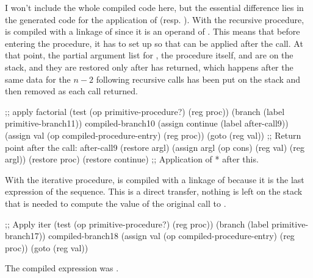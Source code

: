 \begin{exe}[5.34]
    I won’t include the whole compiled code here, but the essential difference 
    lies in the generated code for the application of  (resp. 
    ). With the recursive procedure,  is 
    compiled with a linkage of  since it is an operand of \vscm{*}. 
    This means that before entering the procedure, it has to set up 
     so that \vscm{*} can be applied after the call. At that 
    point, the partial argument list for \vscm{*}, the procedure \vscm{*} 
    itself, and  are on the stack, and they are restored only 
    after  has returned, which happens after the same 
    data for the $n - 2$ following recursive calls has been put on the stack and 
    then removed as each call returned.
    \begin{cscm}
	;; apply factorial
	  (test (op primitive-procedure?) (reg proc))
	  (branch (label primitive-branch11))
	compiled-branch10
	  (assign continue (label after-call9))
	  (assign val (op compiled-procedure-entry) (reg proc))
	  (goto (reg val))
	;; Return point after the call:
	after-call9
	  (restore argl)
	  (assign argl (op cons) (reg val) (reg argl))
	  (restore proc)
	  (restore continue)
	;; Application of * after this.
    \end{cscm}
    With the iterative procedure,
     is compiled with a linkage 
    of  because it is the last expression of the sequence. This is 
    a direct transfer, nothing is left on the stack that is needed to compute 
    the value of the original call to .
    \begin{cscm}
	;; Apply iter
	  (test (op primitive-procedure?) (reg proc))
	  (branch (label primitive-branch17))
	compiled-branch18
	  (assign val (op compiled-procedure-entry) (reg proc))
	  (goto (reg val))
    \end{cscm}
\end{exe}

\begin{exe}[5.35]
    The compiled expression was .
\end{exe}

